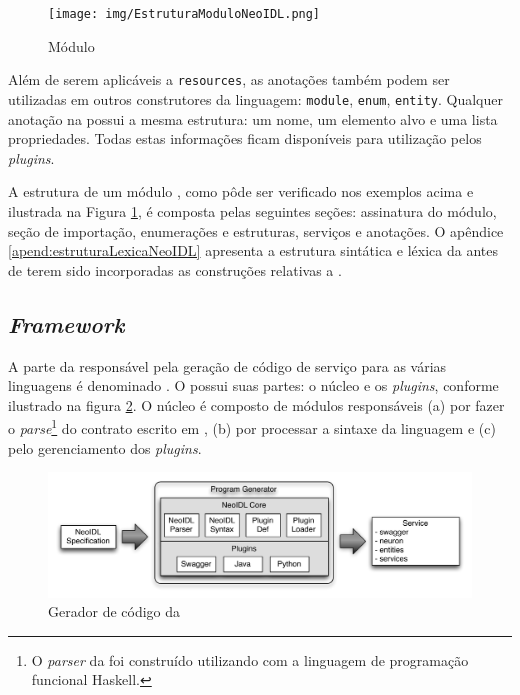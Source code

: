 \begin{figure}[htb]
\begin{center}
\texttt{[image: img/EstruturaModuloNeoIDL.png]}
\end{center}
\caption{Módulo \neoidl{}}
\label{fig:moduloNeoIDL}
\end{figure}

Além de serem aplicáveis a \texttt{resources}, as anotações também podem ser
utilizadas em outros construtores da linguagem: \texttt{module},
\texttt{enum}, \texttt{entity}. Qualquer anotação na \neoidl{} possui a mesma estrutura: um
nome, um elemento alvo e uma lista propriedades. Todas estas informações ficam
disponíveis para utilização pelos \textit{plugins}.


A estrutura de um módulo \neoidl{}, como pôde ser verificado nos exemplos
acima e ilustrada na Figura \ref{fig:moduloNeoIDL}, é composta pelas seguintes
seções: assinatura do módulo, seção de importação, enumerações e estruturas,
serviços e anotações. O apêndice \ref{apend:estruturaLexicaNeoIDL} apresenta a
estrutura sintática e léxica da \neoidl{} antes de terem sido incorporadas as construções
relativas a \designbycontract{}.



\subsection{\textit{Framework}}
\label{frameNeoIDL}
\vspace{-6mm}

A parte da \neoidl{} responsável pela geração de código de
serviço para as várias linguagens é denominado \framework{} \neoidl{}. O
\framework{} \neoidl{} possui suas partes: o núcleo e os \textit{plugins},
conforme ilustrado na figura \ref{fig:programGenerator}.
O núcleo é composto de módulos responsáveis (a) por fazer o \textit{parse}\footnote{O \textit{parser} da \neoidl{}
foi construído utilizando \bnfc{} \cite{ranta-bnfc:2012} com a linguagem de
programação funcional Haskell.}
do contrato escrito em \neoidl{}, (b) por processar a sintaxe da linguagem \neoidl{} e (c) pelo gerenciamento dos \textit{plugins}.

\begin{figure}[h]
\begin{center}
\includegraphics[scale=0.55,trim=0cm 1.5cm 0cm 0cm]{img/programgenerator.pdf}
\vspace{-.5cm}
\end{center}
\caption{Gerador de código da \neoidl{}}
\label{fig:programGenerator}
\end{figure}

